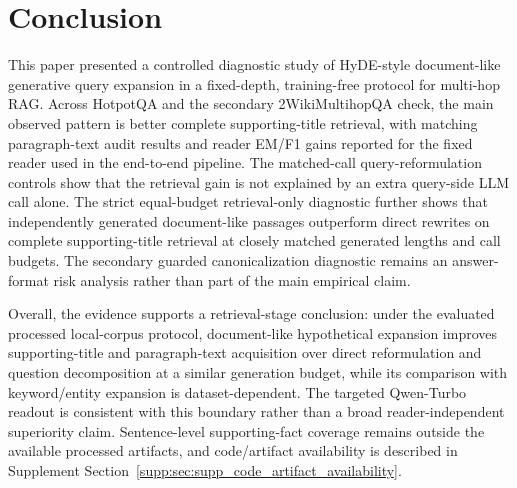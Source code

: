 \section{Conclusion}
\label{sec:conclusion}

This paper presented a controlled diagnostic study of HyDE-style document-like generative query expansion in a fixed-depth, training-free protocol for multi-hop RAG. Across HotpotQA and the secondary 2WikiMultihopQA check, the main observed pattern is better complete supporting-title retrieval, with matching paragraph-text audit results and reader EM/F1 gains reported for the fixed reader used in the end-to-end pipeline. The matched-call query-reformulation controls show that the retrieval gain is not explained by an extra query-side LLM call alone. The strict equal-budget retrieval-only diagnostic further shows that independently generated document-like passages outperform direct rewrites on complete supporting-title retrieval at closely matched generated lengths and call budgets. The secondary guarded canonicalization diagnostic remains an answer-format risk analysis rather than part of the main empirical claim.

Overall, the evidence supports a retrieval-stage conclusion: under the evaluated processed local-corpus protocol, document-like hypothetical expansion improves supporting-title and paragraph-text acquisition over direct reformulation and question decomposition at a similar generation budget, while its comparison with keyword/entity expansion is dataset-dependent. The targeted Qwen-Turbo readout is consistent with this boundary rather than a broad reader-independent superiority claim. Sentence-level supporting-fact coverage remains outside the available processed artifacts, and code/artifact availability is described in Supplement Section~\ref{supp:sec:supp_code_artifact_availability}.

